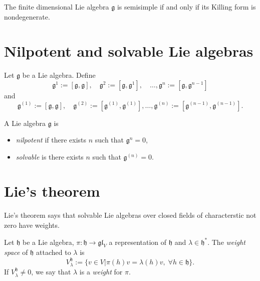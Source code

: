 \begin{theorem}[Cartan]
\label{theorem-finite-dimensional-Lie-algebra-is
-semisimple-iff-Killing-form-is-nondegenerate}
The finite dimensional Lie algebra $\mathfrak{g}$ is semisimple if and only if
its Killing form is nondegenerate.
\end{theorem}

\section{Nilpotent and solvable Lie algebras}
\label{section-nilpotent-and-solvable-Lie-algebras}

Let $\mathfrak{g}$ be a Lie algebra. Define
$$
\mathfrak{g}^1:=[\mathfrak{g},\mathfrak{g}],\quad 
\mathfrak{g}^2:=[\mathfrak{g},\mathfrak{g}^1],\quad 
\ldots,
\mathfrak{g}^n:=[\mathfrak{g},\mathfrak{g}^{n-1}]
$$
and
$$
\mathfrak{g}^{(1)}:=[\mathfrak{g},\mathfrak{g}],\quad 
\mathfrak{g}^{(2)}:=[\mathfrak{g}^{(1)},\mathfrak{g}^{(1)}],
\ldots,
\mathfrak{g}^{(n)}:=[\mathfrak{g}^{(n-1)},\mathfrak{g}^{(n-1)}].
$$

\begin{definition}
\label{definition-nilpotent-and-solvable-Lie-algebras}
A Lie algebra $\mathfrak{g}$ is
\begin{itemize}
\item {\it nilpotent} if there exists $n$ such that $\mathfrak{g}^n=0$,
\item {\it solvable} is there exists $n$ such that $\mathfrak{g}^{(n)}=0$.
\end{itemize}
\end{definition}

\section{Lie's theorem}
\label{section-Lie-theorem}

Lie's theorem says that solvable Lie algebras over closed fields of
characterstic not zero have weights.

\begin{definition}
\label{definition-weight-space}
Let $\mathfrak{h}$ be a Lie algebra, 
$\pi:\mathfrak{h}\to\mathfrak{gl}_V$ a representation of $\mathfrak{h}$ 
and $\lambda \in \mathfrak{h}^*$. The {\it weight space} of $\mathfrak{h}$
attached to $\lambda$ is
$$
V_\lambda^{\mathfrak{h}}:=\{v \in V|\pi(h)v=\lambda(h)v,\; 
\forall h \in \mathfrak{h}\}.
$$
If $V_\lambda^{\mathfrak{h}}\neq 0$, we say that $\lambda$ is a {\it weight} for
$\pi$.
\end{definition}

